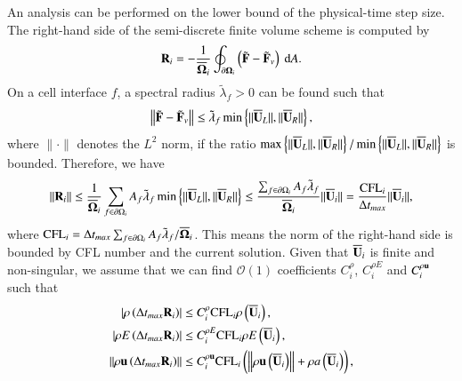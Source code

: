 An analysis can be performed on the lower bound of the physical-time step size.
The right-hand side of the semi-discrete finite volume scheme is computed by
\begin{equation}
    \label{eq:Semi-FV-1}
    \mathbf{R}_i = -\frac{1}{\overline{\mathbf{\Omega}}_i} \oint_{\partial \mathbf{\Omega}_i} \left(\tilde{\mathbf{F}} - \tilde{\mathbf{F}}_v \right) \ \dd A.
\end{equation}
On a cell interface $f$, a spectral radius $\tilde{\lambda}_f>0$ can be found such that
\begin{equation}
    \left\| \tilde{\mathbf{F}} - \tilde{\mathbf{F}}_v \right\| \leq \tilde{\lambda}_f \min \left\{\|\overline{\mathbf{U}}_L\|, \|\overline{\mathbf{U}}_R\| \right\},
\end{equation}
where $\|\cdot\|$ denotes the $L^2$ norm, if the ratio $\max \left\{\|\overline{\mathbf{U}}_L\|, \|\overline{\mathbf{U}}_R\| \right\}/\min \left\{\|\overline{\mathbf{U}}_L\|, \|\overline{\mathbf{U}}_R\| \right\}$ is bounded.
Therefore, we have
\begin{equation}
\label{eq:upper-bound-residual}
    \left\| \mathbf{R}_i \right\| 
    \leq \frac{1}{\overline{\mathbf{\Omega}}_i} \sum_{f \in \partial \Omega_i}{
        A_{f} \tilde{\lambda}_{f} \min \left\{\|\overline{\mathbf{U}}_L\|, \|\overline{\mathbf{U}}_R\| \right\}
    } 
    \leq \frac{\sum_{f \in \partial \Omega_i} A_f\tilde{\lambda}_f}{\overline{\mathbf{\Omega}}_i}\|\overline{\mathbf{U}}_i\|
    =
    \frac{\text{CFL}_i}{\mathrm\Delta t_{max}}\|\overline{\mathbf{U}}_i\|,
\end{equation}
where $\text{CFL}_i= \mathrm\Delta t_{max}\sum_{f \in \partial \Omega_i} A_f \tilde{\lambda}_f/\overline{\mathbf{\Omega}}_i$. 
This means the norm of the right-hand side is 
bounded by CFL number and the current solution.
Given that $\overline{\mathbf{U}}_i$ is finite and non-singular, we assume that we can find $\mathcal{O}(1)$ coefficients $C^{\rho}_i$, $C^{\rho E}_i$ and $C^{\rho \mathbf{u}}_i$ such that
\begin{equation}
    \begin{aligned}
    \label{eq:inc_upper_cond_const_coef}
        \left| \rho\left( \mathrm\Delta t_{max} \mathbf{R}_i \right) \right|
        & \leq
        C^\rho_i    \text{CFL}_i \rho\left( \overline{\mathbf{U}}_i \right),\\
        \left| \rho E\left( \mathrm\Delta t_{max} \mathbf{R}_i \right) \right|
        & \leq
        C^{\rho E}_i \text{CFL}_i \rho E\left( \overline{\mathbf{U}}_i \right),\\
        \left\| \rho \mathbf{u}\left( \mathrm\Delta t_{max} \mathbf{R}_i \right) \right\|
        & \leq 
        C^{\rho \mathbf{u}}_i \text{CFL}_i  
        \left(
        \left\| \rho \mathbf{u}\left( \overline{\mathbf{U}}_i \right) \right\|
        + \rho a\left(\overline{\mathbf{U}}_i \right)
        \right) 
        ,\\
    \end{aligned}
\end{equation}
